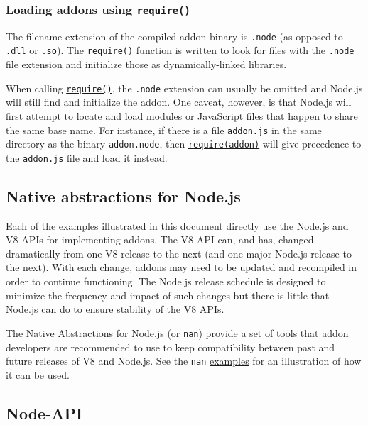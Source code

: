 \subsubsection{\texorpdfstring{Loading addons using
\texttt{require()}}{Loading addons using require()}}\label{loading-addons-using-require}

The filename extension of the compiled addon binary is \texttt{.node}
(as opposed to \texttt{.dll} or \texttt{.so}). The
\href{modules.md\#requireid}{\texttt{require()}} function is written to
look for files with the \texttt{.node} file extension and initialize
those as dynamically-linked libraries.

When calling \href{modules.md\#requireid}{\texttt{require()}}, the
\texttt{.node} extension can usually be omitted and Node.js will still
find and initialize the addon. One caveat, however, is that Node.js will
first attempt to locate and load modules or JavaScript files that happen
to share the same base name. For instance, if there is a file
\texttt{addon.js} in the same directory as the binary
\texttt{addon.node}, then
\href{modules.md\#requireid}{\texttt{require(\textquotesingle{}addon\textquotesingle{})}}
will give precedence to the \texttt{addon.js} file and load it instead.

\subsection{Native abstractions for
Node.js}\label{native-abstractions-for-node.js}

Each of the examples illustrated in this document directly use the
Node.js and V8 APIs for implementing addons. The V8 API can, and has,
changed dramatically from one V8 release to the next (and one major
Node.js release to the next). With each change, addons may need to be
updated and recompiled in order to continue functioning. The Node.js
release schedule is designed to minimize the frequency and impact of
such changes but there is little that Node.js can do to ensure stability
of the V8 APIs.

The \href{https://github.com/nodejs/nan}{Native Abstractions for
Node.js} (or \texttt{nan}) provide a set of tools that addon developers
are recommended to use to keep compatibility between past and future
releases of V8 and Node.js. See the \texttt{nan}
\href{https://github.com/nodejs/nan/tree/HEAD/examples/}{examples} for
an illustration of how it can be used.

\subsection{Node-API}\label{node-api}

